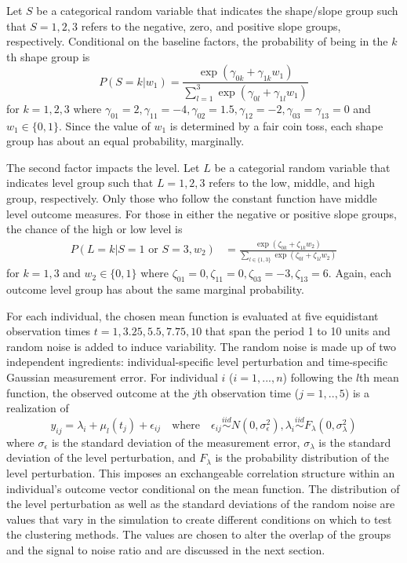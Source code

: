 Let $S$ be a categorical random variable that indicates the shape/slope group such that $S=1,2,3$ refers to the negative, zero, and positive slope groups, respectively. Conditional on the baseline factors, the probability of being in the $k$th shape group is
$$P(S=k |w_{1}) = \frac{\exp(\gamma_{0k}+\gamma_{1k}w_{1})}{\sum^{3}_{l=1} \exp(\gamma_{0l}+\gamma_{1l}w_{1})}$$
for $k=1,2,3$ where $\gamma_{01}=2,\gamma_{11} = -4,\gamma_{02}=1.5,\gamma_{12}=-2,\gamma_{03}=\gamma_{13} = 0$ and $w_{1}\in\{0,1\}$. Since the value of $w_{1}$ is determined by a fair coin toss, each shape group has about an equal probability, marginally. 

The second factor impacts the level. Let $L$ be a categorial random variable that indicates level group such that $L=1,2,3$ refers to the low, middle, and high group, respectively. Only those who follow the constant function have middle level outcome measures. For those in either the negative or positive slope groups, the chance of the high or low level is
\begin{align*}
P(L=k|S=1 \text{ or } S=3,w_{2}) & = \frac{\exp(\zeta_{0k}+\zeta_{1k} w_{2})}{\sum_{l\in\{1,3\} }\exp(\zeta_{0l}+\zeta_{1l}w_{2})}
\end{align*}
for $k=1,3$ and $w_{2}\in\{0,1\}$ where $\zeta_{01}=0,\zeta_{11}=0,\zeta_{03}=-3,\zeta_{13}=6$. Again, each outcome level group has about the same marginal probability.

For each individual, the chosen mean function is evaluated at five equidistant observation times $t=1,3.25,5.5,7.75,10$ that span the period 1 to 10 units and random noise is added to induce variability. The random noise is made up of two independent ingredients: individual-specific level perturbation and time-specific Gaussian measurement error. For individual $i$ ($i=1,...,n$)  following the $l$th mean function, the observed outcome at the $j$th observation time ($j=1,..,5$) is a realization of
$$y_{ij} = \lambda_{i}+\mu_{l}(t_{j})+\epsilon_{ij}\quad\text{where}\quad \epsilon_{ij}\stackrel{iid}{\sim} N(0,\sigma_{\epsilon}^{2}), \lambda_{i}\stackrel{iid}{\sim} F_{\lambda}(0,\sigma_{\lambda}^{2})$$
where $\sigma_{\epsilon}$  is the standard deviation of the measurement error, $\sigma_{\lambda}$ is the standard deviation of the level perturbation, and $F_{\lambda}$ is the probability distribution of the level perturbation. This imposes an exchangeable correlation structure within an individual's outcome vector conditional on the mean function. The distribution of the level perturbation as well as the standard deviations of the random noise are values that vary in the simulation to create different conditions on which to test the clustering methods. The values are chosen to alter the overlap of the groups and the signal to noise ratio and are discussed in the next section.

